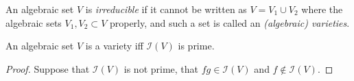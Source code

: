 \documentclass[11pt]{book}
\begin{document}
\begin{definitionbox}An algebraic set $V$ is \textit{irreducible} if it cannot be written as $V=V_1\cup V_2$ where the algebraic sets $V_1,V_2\subset V$ properly, and such a set is called an \textit{(algebraic) varieties}.
\end{definitionbox}
\begin{lemma}An algebraic set $V$ is a variety iff $\mathcal{I}(V)$ is prime.
\begin{proof}Suppose that $\mathcal{I}(V)$ is not prime, that $fg\in \mathcal{I}(V)$ and $f\not\in \mathcal{I}(V)$.
\end{proof}
\end{lemma}
\end{document}
